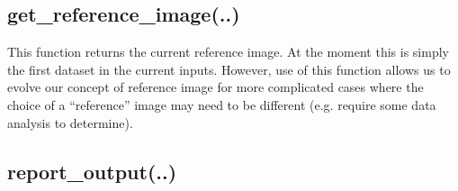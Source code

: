 \documentclass[letterpaper,10pt,english]{sphinxmanual}
\begin{document}
\subsection{get\_reference\_image(..)}
\label{chapter_ReductionContextClass:get-reference-image}

\begin{fulllineitems}
\label{chapter_ReductionContextClass:astrodata.RecipeManager.ReductionContext.get_reference_image}
This function returns the current reference image.  At the moment
this is simply the first dataset in the current inputs.  However,
use of this function allows us to evolve our concept of reference
image for more complicated cases where the choice of a ``reference'' image
may need to be different (e.g. require some data analysis to determine).

\end{fulllineitems}



\subsection{report\_output(..)}
\label{chapter_ReductionContextClass:report-output}
\end{document}
